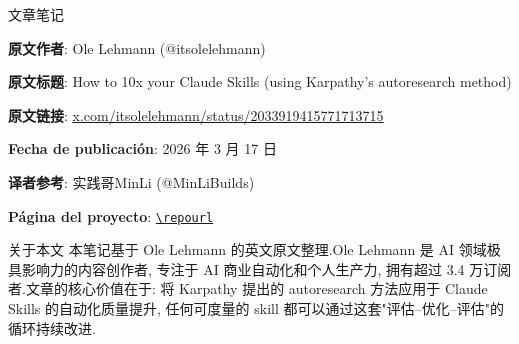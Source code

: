 
\begin{titlepage}
\centering
{\Large 文章笔记\par}
\vspace{1.2cm}
{\huge\bfseries \notetitle\par}
\vspace{0.8cm}
{\large \noteauthors\par}
\vspace{0.3cm}
{\large \notedate\par}
\vspace{1.5cm}

\begin{tcolorbox}[width=0.9\textwidth, colback=black!2!white, colframe=black!60, sharp corners]
\textbf{原文作者}: Ole Lehmann (@itsolelehmann)\par
\textbf{原文标题}: How to 10x your Claude Skills (using Karpathy's autoresearch method)\par
\textbf{原文链接}: \href{https://x.com/itsolelehmann/status/2033919415771713715}{x.com/itsolelehmann/status/2033919415771713715}\par
\textbf{Fecha de publicación}: 2026 年 3 月 17 日\par
\textbf{译者参考}: 实践哥MinLi (@MinLiBuilds)\par
\textbf{Página del proyecto}: \href{\repourl}{\nolinkurl{\repourl}}\par
\end{tcolorbox}

\vspace{1cm}
\begin{knowledgebox}{关于本文}
本笔记基于 Ole Lehmann 的英文原文整理.Ole Lehmann 是 AI 领域极具影响力的内容创作者, 专注于 AI 商业自动化和个人生产力, 拥有超过 3.4 万订阅者.文章的核心价值在于: 将 Karpathy 提出的 autoresearch 方法应用于 Claude Skills 的自动化质量提升, 任何可度量的 skill 都可以通过这套"评估--优化--评估"的循环持续改进.
\end{knowledgebox}

\end{titlepage}

\tableofcontents
\newpage


